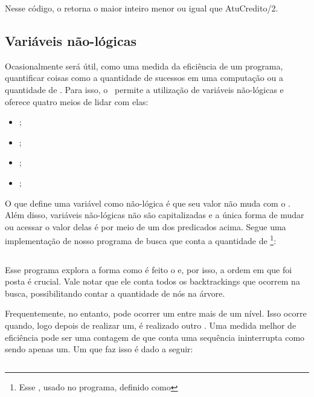 \documentclass{article}
\begin{document}
\inputminted{prolog}{../Exemplos/Cap8/prog4_partilha2.pl}

Nesse código, o  retorna o maior inteiro menor ou igual que AtuCredito/2.

\subsection{Variáveis não-lógicas}

  Ocasionalmente será útil, como uma medida da eficiência de um programa, quantificar coisas como a quantidade de sucessos em uma computação ou a quantidade de . Para isso, o \eclipse\ permite a utilização de variáveis não-lógicas e oferece quatro meios de lidar com elas:

  \begin{itemize}
    \item {};
    \item {};
    \item {};
    \item {};
  \end{itemize}

  O que define uma variável como não-lógica é que seu valor não muda com o .
  Além disso, variáveis não-lógicas não são capitalizadas e a única forma de mudar ou acessar o
  valor delas é por meio de um dos predicados acima. Segue uma implementação de nosso programa de
  busca que conta a quantidade de \footnote{Esse , usado no programa, definido como }:

\inputminted{prolog}{../Exemplos/Cap8/prog5_busca3.pl}

Esse programa explora a forma como é feito o  e, por isso, a ordem em que foi posta é crucial. Vale notar que ele conta todos os backtrackings que ocorrem na busca, possibilitando contar a quantidade de nós na árvore.

Frequentemente, no entanto, pode ocorrer um  entre mais de um nível. Isso
ocorre quando, logo depois de realizar um, é realizado outro . Uma medida
melhor de eficiência pode ser uma contagem de  que conta uma sequência
ininterrupta como sendo apenas um. Um  que faz isso é dado a seguir:

\inputminted{prolog}{../Exemplos/Cap8/prog6_conta_backtrack.pl}
\end{document}
